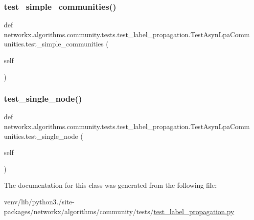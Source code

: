 \subsubsection{\texorpdfstring{test\+\_\+simple\+\_\+communities()}{test\_simple\_communities()}}
{\footnotesize\ttfamily def networkx.\+algorithms.\+community.\+tests.\+test\+\_\+label\+\_\+propagation.\+Test\+Asyn\+Lpa\+Communities.\+test\+\_\+simple\+\_\+communities (\begin{DoxyParamCaption}\item[{}]{self }\end{DoxyParamCaption})}

\mbox{\label{classnetworkx_1_1algorithms_1_1community_1_1tests_1_1test__label__propagation_1_1TestAsynLpaCommunities_a1320775702d837dd5cfb8098ade78cf8}} 
\subsubsection{\texorpdfstring{test\+\_\+single\+\_\+node()}{test\_single\_node()}}
{\footnotesize\ttfamily def networkx.\+algorithms.\+community.\+tests.\+test\+\_\+label\+\_\+propagation.\+Test\+Asyn\+Lpa\+Communities.\+test\+\_\+single\+\_\+node (\begin{DoxyParamCaption}\item[{}]{self }\end{DoxyParamCaption})}



The documentation for this class was generated from the following file\+:\begin{DoxyCompactItemize}
\item 
venv/lib/python3./site-\/packages/networkx/algorithms/community/tests/\hyperlink{test__label__propagation_8py}{test\+\_\+label\+\_\+propagation.\+py}\end{DoxyCompactItemize}

